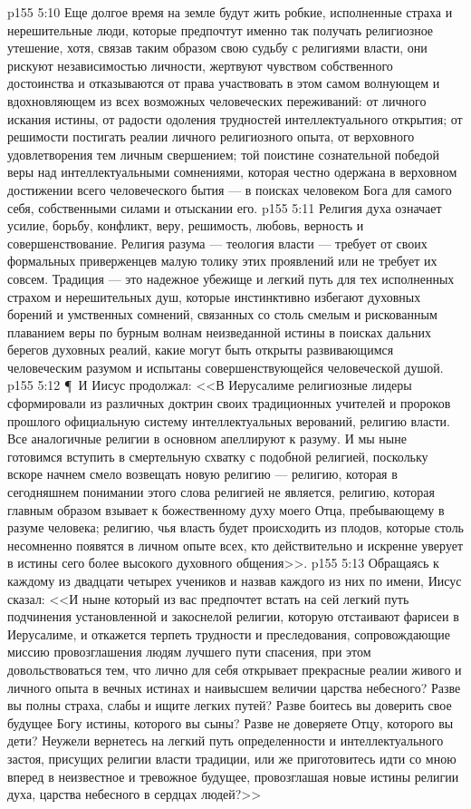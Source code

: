 \vs p155 5:10 Еще долгое время на земле будут жить робкие, исполненные страха и нерешительные люди, которые предпочтут именно так получать религиозное утешение, хотя, связав таким образом свою судьбу с религиями власти, они рискуют независимостью личности, жертвуют чувством собственного достоинства и отказываются от права участвовать в этом самом волнующем и вдохновляющем из всех возможных человеческих переживаний: от личного искания истины, от радости одоления трудностей интеллектуального открытия; от решимости постигать реалии личного религиозного опыта, от верховного удовлетворения тем личным свершением; той поистине сознательной победой веры над интеллектуальными сомнениями, которая честно одержана в верховном достижении всего человеческого бытия --- в поисках человеком Бога для самого себя, собственными силами и отыскании его.
\vs p155 5:11 Религия духа означает усилие, борьбу, конфликт, веру, решимость, любовь, верность и совершенствование. Религия разума --- теология власти --- требует от своих формальных приверженцев малую толику этих проявлений или не требует их совсем. Традиция --- это надежное убежище и легкий путь для тех исполненных страхом и нерешительных душ, которые инстинктивно избегают духовных борений и умственных сомнений, связанных со столь смелым и рискованным плаванием веры по бурным волнам неизведанной истины в поисках дальних берегов духовных реалий, какие могут быть открыты развивающимся человеческим разумом и испытаны совершенствующейся человеческой душой.
\vs p155 5:12 \P\ И Иисус продолжал: <<В Иерусалиме религиозные лидеры сформировали из различных доктрин своих традиционных учителей и пророков прошлого официальную систему интеллектуальных верований, религию власти. Все аналогичные религии в основном апеллируют к разуму. И мы ныне готовимся вступить в смертельную схватку с подобной религией, поскольку вскоре начнем смело возвещать новую религию --- религию, которая в сегодняшнем понимании этого слова религией не является, религию, которая главным образом взывает к божественному духу моего Отца, пребывающему в разуме человека; религию, чья власть будет происходить из плодов, которые столь несомненно появятся в личном опыте всех, кто действительно и искренне уверует в истины сего более высокого духовного общения>>.
\vs p155 5:13 Обращаясь к каждому из двадцати четырех учеников и назвав каждого из них по имени, Иисус сказал: <<И ныне который из вас предпочтет встать на сей легкий путь подчинения установленной и закоснелой религии, которую отстаивают фарисеи в Иерусалиме, и откажется терпеть трудности и преследования, сопровождающие миссию провозглашения людям лучшего пути спасения, при этом довольствоваться тем, что лично для себя открывает прекрасные реалии живого и личного опыта в вечных истинах и наивысшем величии царства небесного? Разве вы полны страха, слабы и ищите легких путей? Разве боитесь вы доверить свое будущее Богу истины, которого вы сыны? Разве не доверяете Отцу, которого вы дети? Неужели вернетесь на легкий путь определенности и интеллектуального застоя, присущих религии власти традиции, или же приготовитесь идти со мною вперед в неизвестное и тревожное будущее, провозглашая новые истины религии духа, царства небесного в сердцах людей?>>
